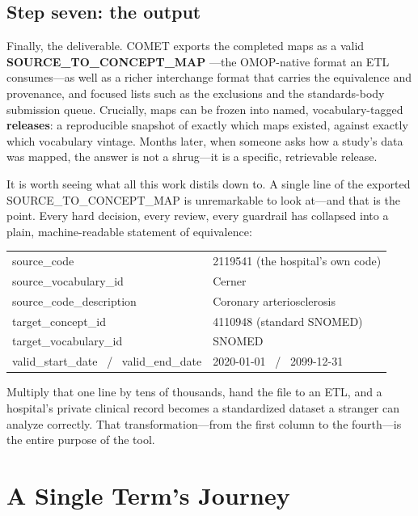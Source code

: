 \documentclass[12pt,openany]{book}
\newcommand{\code}[1]{{\ttfamily\small #1}}
\begin{document}
\subsection{Step seven: the output}

Finally, the deliverable. COMET exports the completed maps as a valid \textbf{SOURCE\_TO\_CONCEPT\_MAP}
---the OMOP-native format an ETL consumes---as well as a richer interchange format that carries the
equivalence and provenance, and focused lists such as the exclusions and the standards-body submission
queue. Crucially, maps can be frozen into named, vocabulary-tagged \textbf{releases}: a reproducible
snapshot of exactly which maps existed, against exactly which vocabulary vintage. Months later, when
someone asks how a study's data was mapped, the answer is not a shrug---it is a specific, retrievable
release.

It is worth seeing what all this work distils down to. A single line of the exported
SOURCE\_TO\_CONCEPT\_MAP is unremarkable to look at---and that is the point. Every hard decision, every
review, every guardrail has collapsed into a plain, machine-readable statement of equivalence:

\begin{center}
\small\sffamily
\begin{tabular}{@{}ll@{}}
\toprule
\code{source\_code} & \code{2119541} \quad\textrm{\small(the hospital's own code)} \\
\code{source\_vocabulary\_id} & Cerner \\
\code{source\_code\_description} & Coronary arteriosclerosis \\
\code{target\_concept\_id} & \code{4110948} \quad\textrm{\small(standard SNOMED)} \\
\code{target\_vocabulary\_id} & SNOMED \\
\code{valid\_start\_date} \ / \ \code{valid\_end\_date} & \code{2020-01-01} \ / \ \code{2099-12-31} \\
\bottomrule
\end{tabular}
\end{center}

Multiply that one line by tens of thousands, hand the file to an ETL, and a hospital's private clinical
record becomes a standardized dataset a stranger can analyze correctly. That transformation---from the
first column to the fourth---is the entire purpose of the tool.

\clearpage
\section{A Single Term's Journey}
\end{document}
